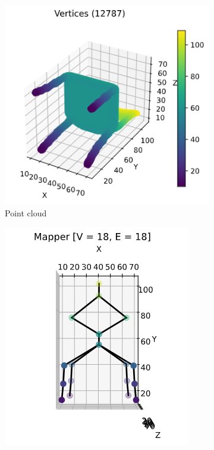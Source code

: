 \documentclass{article}
\begin{document}
\begin{figure}[H]
    \centering
    \begin{subfigure}[c]{0.3\columnwidth}
        \centering
        \includegraphics[width=\textwidth]{chair-point-cloud}
        \caption{Point cloud}
        \label{fig:chair-points}
    \end{subfigure}
    \begin{subfigure}[c]{0.25\columnwidth}
        \centering
        \includegraphics[width=\textwidth]{chair-graph-3d}

\end{subfigure}
\end{figure}
\end{document}
